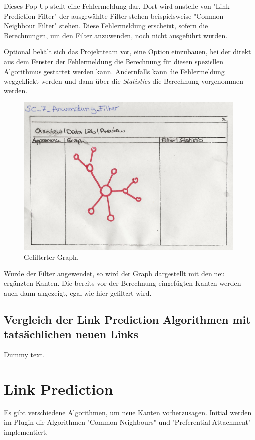 Dieses Pop-Up stellt eine Fehlermeldung dar. Dort wird anstelle von "Link Prediction Filter" der ausgewählte Filter
stehen beispielsweise "Common Neighbour Filter" stehen. Diese Fehlermeldung erscheint, sofern die Berechnungen, um den
Filter anzuwenden, noch nicht ausgeführt wurden.

Optional behält sich das Projektteam vor, eine Option einzubauen, bei der direkt aus dem Fenster der Fehlermeldung die
Berechnung für diesen speziellen Algorithmus gestartet werden kann. Andernfalls kann die Fehlermeldung weggeklickt
werden und dann über die \textit{Statistics} die Berechnung vorgenommen werden.

\begin{figure}[htbp]
    \includegraphics[width=\linewidth]{resources/SC-7.png}
    \caption{Gefilterter Graph.}
    \label{fig:screen7}
\end{figure}

Wurde der Filter angewendet, so wird der Graph dargestellt mit den neu ergänzten Kanten. Die bereits vor der Berechnung
eingefügten Kanten werden auch dann angezeigt, egal wie hier gefiltert wird.

\subsection{Vergleich der Link Prediction Algorithmen mit tatsächlichen neuen Links}

Dummy text.

\section{Link Prediction}
Es gibt verschiedene Algorithmen, um neue Kanten vorherzusagen. Initial werden im Plugin die Algorithmen "Common Neighbours" und "Preferential Attachment" implementiert.

